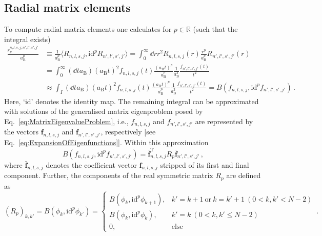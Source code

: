 \documentclass[fontsize=12pt,
               twoside=false,
               BCOR=0mm,
               DIV=14,
               overfullrule=false, %
               toc=bibliography,
               headinclude=true,
               footinclude=false]{scrartcl}
\numberwithin{equation}{section}
\newcommand{\aB}{a_\mathrm{B}}
\begin{document}
    \subsection{Radial matrix elements}
    \label{subsec:RadialMatrixElements}

    To compute radial matrix elements one calculates for $p\in\mathbb{R}$
    (such that the integral exists)
    \begingroup
    \allowdisplaybreaks
    \begin{align}\label{eq:RadialMatrixElement}
        \frac{r^{n,l,s,j;n',l',s',j'}_p}{\aB^p}
        &\equiv
        \frac{1}{\aB^p} \langle R_{n,l,s,j},
        \mathrm{id}^p R_{n',l',s',j'} \rangle
        =
        \int^\infty_0 \dd{r} r^2
        R_{n,l,s,j}(r)
        \frac{r^p}{\aB^p}
        R_{n',l',s',j'}(r)
        \nonumber
    \\
        &=
        \int^\infty_0 (\dd{t} \aB) (\aB t)^2
        f_{n,l,s,j}(t)
        \frac{(\aB t)^p}{\aB^p} \frac{1}{\aB^3}
        \frac{f_{n',l',s',j'}(t)}{t^2}
        \nonumber
    \\
        &\approx
        \int_I (\dd{t} \aB) (\aB t)^2
        f_{n,l,s,j}(t)
        \frac{(\aB t)^p}{\aB^p} \frac{1}{\aB^3}
        \frac{f_{n',l',s',j'}(t)}{t^2}
        =
        B(f_{n,l,s,j}, \mathrm{id}^p f_{n',l',s',j'})
    \,.
    \end{align}
    \endgroup
    Here, `$\mathrm{id}$' denotes the identity map. The remaining integral can
    be approximated with solutions of the generalised matrix eigenproblem
    posed by Eq.~\eqref{eq:MatrixEigenvalueProblem}, i.e., $f_{n,l,s,j}$ and
    $f_{n',l',s',j'}$ are represented by the vectors $\bm{f}_{n,l,s,j}$ and
    $\bm{f}_{n',l',s',j'}$, respectively [see
    Eq.~\eqref{eq:ExpansionOfEigenfunctions}]. Within this approximation
    \begin{equation}
        B(f_{n,l,s,j}, \mathrm{id}^p f_{n',l',s',j'})
        =
        \bar{\bm{f}}_{n,l,s,j}^\mathrm{T} R_p \bar{\bm{f}}_{n',l',s',j'}
    \,,
    \end{equation}
    where $\bar{\bm{f}}_{n,l,s,j}$ denotes the coefficient vector
    $\bm{f}_{n,l,s,j}$ stripped of its first and final component. Further, the
    components of the real symmetric matrix $R_p$ are defined as
    \begin{equation}
        (R_p)_{k,k'}
        =
        B(\phi_k,\mathrm{id}^p\phi_{k'})
        =
        \begin{cases}
            B(\phi_k,\mathrm{id}^p\phi_{k+1}),
            & k'=k+1 \ \text{or} \ k=k'+1 \ (0<k,k'<N-2)
        \\
            B(\phi_k,\mathrm{id}^p\phi_{k}),
            & k'=k \ (0<k,k'\leq{N-2})
        \\
        0, & \text{else}
        \end{cases}
    \,.
    \end{equation}
\end{document}
